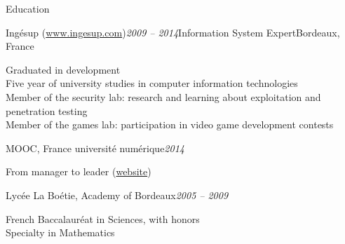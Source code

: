 \begin{rSection}{Education}
  \begin{rSubsection}{Ingésup (\href{www.ingesup.com}{www.ingesup.com})}{\em 2009 -- 2014}{Information System Expert}{Bordeaux, France}
    \item[] Graduated in development \\
    Five year of university studies in computer information technologies \\
    Member of the security lab: research and learning about exploitation and penetration testing \\
    Member of the games lab: participation in video game development contests
  \end{rSubsection}

  \begin{rSubsection}{MOOC, France université numérique}{\em 2014}{}{}
    \item[] From manager to leader (\href{https://www.france-universite-numerique-mooc.fr/courses/CNAM/01002/Trimestre_1_2014/about}{website})
  \end{rSubsection}

  \begin{rSubsection}{Lycée La Boétie, Academy of Bordeaux}{\em 2005 -- 2009}{}{}
    \item[] French Baccalauréat in Sciences, with honors \\
    Specialty in Mathematics
  \end{rSubsection}

\end{rSection}
